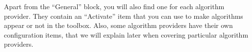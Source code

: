 Apart from the ``General'' block, you will also find one for each algorithm provider. They contain an ``Activate'' item that you can use to make algorithms appear or not in the toolbox. Also, some algorithm providers have their own configuration items, that we will explain later when covering particular algorithm providers.
